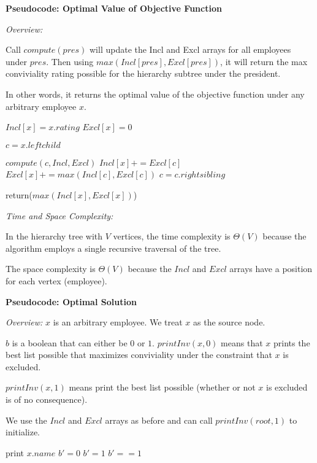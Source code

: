 \documentclass[a4paper]{report}
\begin{document}
\begin{enumerate}
      {\bf Pseudocode: Optimal Value of Objective Function}

      {\it Overview:}

      Call $compute(pres)$ will update the Incl and Excl arrays for all employees under $pres$. 
      Then using $max(Incl[pres], Excl[pres])$, it will return the max conviviality rating possible for the hierarchy subtree under the president.

      In other words, it returns the optimal value of the objective function under any arbitrary employee $x$.

      \begin{algorithmic}[1]
          \State $Incl[x] = x.rating$
          \State $Excl[x] = 0$

          \State $c = x.leftchild$

            \State $compute(c, Incl, Excl)$
            \State $Incl[x] += Excl[c]$
            \State $Excl[x] += max(Incl[c], Excl[c])$
            \State $c = c.rightsibling$
          \EndWhile

          \State return($max(Incl[x], Excl[x])$)
        \EndFunction
      \end{algorithmic}

      {\it Time and Space Complexity:}

      In the hierarchy tree with $V$ vertices, the time complexity is $\Theta(V)$ because the algorithm employs
      a single recursive traversal of the tree. 

      The space complexity is $\Theta(V)$ because the $Incl$ and $Excl$ arrays have a position for each vertex (employee).


      {\bf Pseudocode: Optimal Solution}

      {\it Overview:}
      $x$ is an arbitrary employee. We treat $x$ as the source node. 

      $b$ is a boolean that can either be $0$ or $1$. $printInv(x, 0)$ means that $x$ prints
      the best list possible that maximizes conviviality under the constraint that $x$ is excluded. 
      
      $printInv(x, 1)$ means print the best list possible (whether or not $x$ is excluded is of no consequence).

      We use the $Incl$ and $Excl$ arrays as before and can call $printInv(root, 1)$ to initialize. 

      \begin{algorithmic}[1]
              \State print $x.name$
              \State $b' = 0$
            \Else
              \State $b' = 1$
            \EndIf
          \Else
            \State $b' == 1$
          \EndIf


\end{algorithmic}
\end{enumerate}
\end{document}
